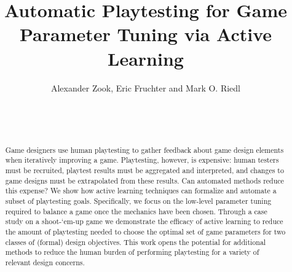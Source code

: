 \documentclass{sig-alternate}
\begin{document}
%

\title{Automatic Playtesting for Game Parameter Tuning via Active Learning}



\author{
\alignauthor
%
Alexander Zook, Eric Fruchter and Mark O. Riedl\\
       \\
       \\
       \\
}


\maketitle
\begin{abstract}
Game designers use human playtesting to gather feedback about game design elements when iteratively improving a game.
Playtesting, however, is expensive: human testers must be recruited, playtest results must be aggregated and interpreted, and changes to game designs must be extrapolated from these results.
Can automated methods reduce this expense?
We show how active learning techniques can formalize and automate a subset of playtesting goals.
Specifically, we focus on the low-level parameter tuning required to balance a game once the mechanics have been chosen.
Through a case study on a shoot-`em-up game we demonstrate the efficacy of active learning to reduce the amount of playtesting needed to choose the optimal set of game parameters for two classes of (formal) design objectives.
This work opens the potential for additional methods to reduce the human burden of performing playtesting for a variety of relevant design concerns.
\end{abstract}
\end{document}
